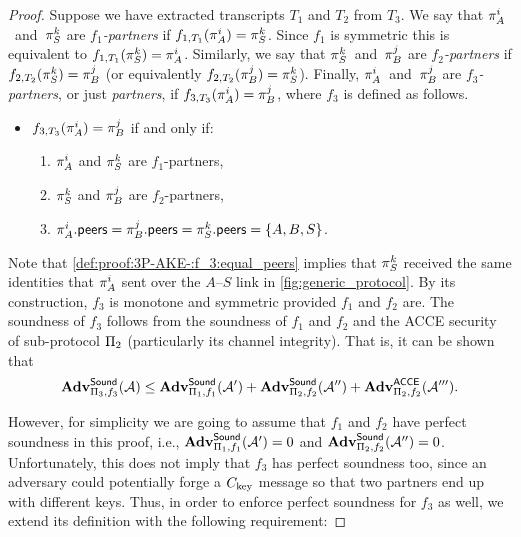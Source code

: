 \begin{proof}
Suppose we have extracted transcripts $T_1$ and $T_2$ from $T_3$.
We say that $\oracle[A][i]$~and~$\oracle[S][k]$ are \emph{$f_1$-partners} if $f_{1,T_1}(\oracle[A][i]) = \oracle[S][k]$.
Since $f_1$ is symmetric this is equivalent to $f_{1,T_1}(\oracle[S][k]) = \oracle[A][i]$.
Similarly,
we say that $\oracle[S][k]$~and~$\oracle[B][j]$ are \emph{$f_2$-partners} if $f_{2,T_2}(\oracle[S][k]) = \oracle[B][j]$ 
(or equivalently $f_{2,T_2}(\oracle[B][j]) = \oracle[S][k]$).
Finally,
$\oracle[A][i]$~and~$\oracle[B][j]$ are \emph{$f_3$-partners},
or just \emph{partners},
if $f_{3,T_3}(\oracle[A][i]) = \oracle[B][j]$,
where $f_3$ is defined as follows.

\item
\begin{itemize}
\item 
$f_{3,T_3}(\oracle[A][i]) = \oracle[B][j]$ if and only if:

\begin{enumerate}
	\item $\oracle[A][i]$ and $\oracle[S][k]$ are $f_1$-partners,
	
	\item $\oracle[S][k]$ and $\oracle[B][j]$ are $f_2$-partners,
	
	\item $\oracle[A][i].\peers = \oracle[B][j].\peers = \oracle[S][k].\peers = \lbrace A, B, S \rbrace$. \label{def:proof:3P-AKE-:f_3:equal_peers}
	


\end{enumerate}
\end{itemize}

Note that \cref{def:proof:3P-AKE-:f_3:equal_peers}  implies that $\oracle[S][k]$ received the same identities that $\oracle[A][i]$ sent  over the $A$--$S$ link in \cref{fig:generic_protocol}. 
By its construction,
$f_3$ is monotone and symmetric provided $f_1$ and $f_2$ are.
The soundness of $f_3$ follows from the soundness of $f_1$ and $f_2$ and the ACCE security of sub-protocol $\mathrm{\Pi}_2$
(particularly its channel integrity).
That is,
it can be shown that 
\begin{equation}\label{eq:proof:3P-AKE-:f_3:soundness}
	\mathbf{Adv}_{\mathrm{\Pi}_3,f_3}^{\mathsf{Sound}}(\mathcal{A}) 
		\leq \mathbf{Adv}_{\mathrm{\Pi}_1,f_1}^{\mathsf{Sound}}(\mathcal{A}') 
			+ \mathbf{Adv}_{\mathrm{\Pi}_2,f_2}^{\mathsf{Sound}}(\mathcal{A}'') 
			+ \mathbf{Adv}_{\mathrm{\Pi}_2,f_2}^{\mathsf{ACCE}}(\mathcal{A}''') .
\end{equation}

However,
for simplicity we are going to assume that $f_1$ and $f_2$ have perfect soundness in this proof,
i.e., $\mathbf{Adv}_{\mathrm{\Pi}_1,f_1}^{\mathsf{Sound}}(\mathcal{A}') = 0$ and $\mathbf{Adv}_{\mathrm{\Pi}_2,f_2}^{\mathsf{Sound}}(\mathcal{A}'') = 0$.
Unfortunately,
this does not imply that $f_3$ has perfect soundness too,
since an adversary could potentially forge a $C_{\mathrm{key}}$ message so that two partners end up with different keys.
Thus,
in order to enforce perfect soundness for $f_3$ as well,
we extend its definition with the following requirement:



\end{proof}
